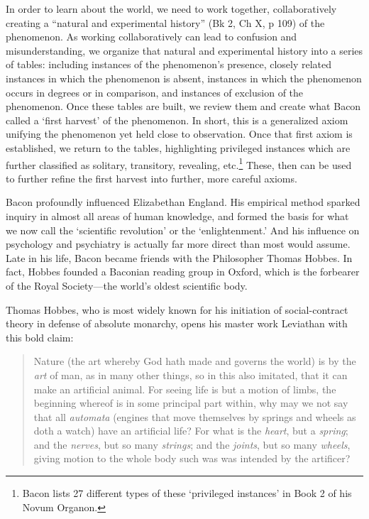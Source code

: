 \begin{refsection}
In order to learn about the world, we need to work together, collaboratively creating a ``natural and experimental history'' (Bk 2, Ch X, p 109) of the phenomenon. As working collaboratively can lead to confusion and misunderstanding, we organize that natural and experimental history into a series of tables: including instances of the phenomenon's presence, closely related instances in which the phenomenon is absent, instances in which the phenomenon occurs in degrees or in comparison, and instances of exclusion of the phenomenon. Once these tables are built, we review them and create what Bacon called a `first harvest' of the phenomenon. In short, this is a generalized axiom unifying the phenomenon yet held close to observation. Once that first axiom is established, we return to the tables, highlighting privileged instances which are further classified as solitary, transitory, revealing, etc.\footnote{Bacon lists 27 different types of these `privileged instances' in Book 2 of his Novum Organon.} These, then can be used to further refine the first harvest into further, more careful axioms.

Bacon profoundly influenced Elizabethan England. His empirical method sparked inquiry in almost all areas of human knowledge, and formed the basis for what we now call the `scientific revolution' or the `enlightenment.' And his influence on psychology and psychiatry is actually far more direct than most would assume. Late in his life, Bacon became friends with the Philosopher Thomas Hobbes. In fact, Hobbes founded a Baconian reading group in Oxford, which is the forbearer of the Royal Society---the world's oldest scientific body.

Thomas Hobbes, who is most widely known for his initiation of social-contract theory in defense of absolute monarchy, opens his master work Leviathan with this bold claim:

\begin{quote}

Nature (the art whereby God hath made and governs the world) is by the \emph{art} of man, as in many other things, so in this also imitated, that it can make an artificial animal. For seeing life is but a motion of limbs, the beginning whereof is in some principal part within, why may we not say that all \emph{automata} (engines that move themselves by springs and wheels as doth a watch) have an artificial life? For what is the \emph{heart}, but a \emph{spring}; and the \emph{nerves}, but so many \emph{strings}; and the \emph{joints}, but so many \emph{wheels}, giving motion to the whole body such was was intended by the artificer? ~\citep[Ch 1, \S 1]{Hobbes:1651wh}
\end{quote}


\end{refsection}
